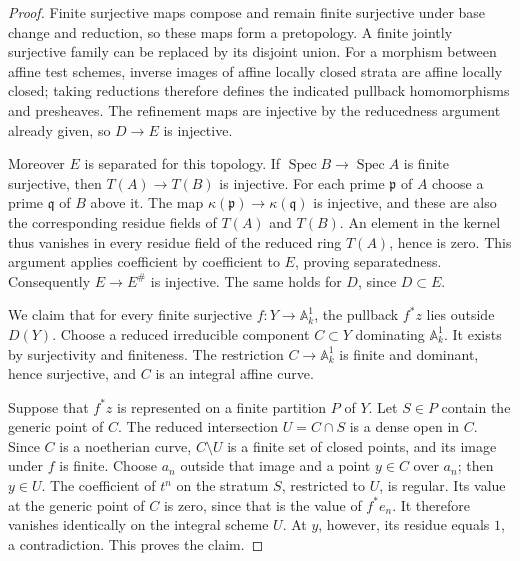 \begin{proof}
Finite surjective maps compose and remain finite surjective under base
change and reduction, so these maps form a pretopology.  A finite
jointly surjective family can be replaced by its disjoint union.
For a morphism between affine test schemes, inverse images of affine
locally closed strata are affine locally closed; taking reductions
therefore defines the indicated pullback homomorphisms and presheaves.
The refinement maps are injective by the reducedness argument already
given, so $D\to E$ is injective.

Moreover $E$ is separated for this topology.  If
$\operatorname{Spec}B\to\operatorname{Spec}A$ is finite surjective,
then $T(A)\to T(B)$ is injective.  For each prime $\mathfrak p$ of
$A$ choose a prime $\mathfrak q$ of $B$ above it.  The map
$\kappa(\mathfrak p)\to\kappa(\mathfrak q)$ is injective, and these
are also the corresponding residue fields of $T(A)$ and $T(B)$.
An element in the kernel thus vanishes in every residue field of the
reduced ring $T(A)$, hence is zero.  This argument applies coefficient
by coefficient to $E$, proving separatedness.  Consequently
$E\to E^\#$ is injective.  The same holds for $D$, since $D\subset E$.

We claim that for every finite surjective
$f:Y\to\mathbb A^1_k$, the pullback $f^*z$ lies outside $D(Y)$.
Choose a reduced irreducible component $C\subset Y$ dominating
$\mathbb A^1_k$.  It exists by surjectivity and finiteness.  The
restriction $C\to\mathbb A^1_k$ is finite and dominant, hence
surjective, and $C$ is an integral affine curve.

Suppose that $f^*z$ is represented on a finite partition $P$ of $Y$.
Let $S\in P$ contain the generic point of $C$.  The reduced intersection
$U=C\cap S$ is a dense open in $C$.  Since $C$ is a noetherian curve,
$C\setminus U$ is a finite set of closed points, and its image under
$f$ is finite.  Choose $a_n$ outside that image and a point $y\in C$
over $a_n$; then $y\in U$.  The coefficient of $t^n$ on the stratum
$S$, restricted to $U$, is regular.  Its value at the generic point of
$C$ is zero, since that is the value of $f^*e_n$.  It therefore
vanishes identically on the integral scheme $U$.  At $y$, however,
its residue equals $1$, a contradiction.  This proves the claim.


\end{proof}
